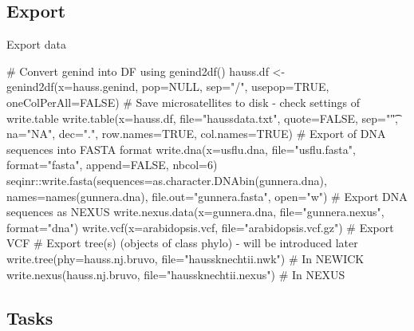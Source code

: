\documentclass[compress, xelatex, 11pt, xcolor=svgnames, aspectratio=169, url={hyphens, lowtilde}]{beamer}
\begin{document}
\subsection{Export}

\begin{frame}[fragile]{Export data}
	\begin{spluscode}
    # Convert genind into DF using genind2df()
    hauss.df <- genind2df(x=hauss.genind, pop=NULL, sep="/",
      usepop=TRUE, oneColPerAll=FALSE)
    # Save microsatellites to disk - check settings of write.table
    write.table(x=hauss.df, file="haussdata.txt", quote=FALSE,
      sep="\t", na="NA", dec=".", row.names=TRUE, col.names=TRUE)
    # Export of DNA sequences into FASTA format
    write.dna(x=usflu.dna, file="usflu.fasta", format="fasta",
      append=FALSE, nbcol=6)
    seqinr::write.fasta(sequences=as.character.DNAbin(gunnera.dna),
      names=names(gunnera.dna), file.out="gunnera.fasta", open="w")
    # Export DNA sequences as NEXUS
    write.nexus.data(x=gunnera.dna, file="gunnera.nexus", format="dna")
    write.vcf(x=arabidopsis.vcf, file="arabidopsis.vcf.gz") # Export VCF
    # Export tree(s) (objects of class phylo) - will be introduced later
    write.tree(phy=hauss.nj.bruvo, file="haussknechtii.nwk") # In NEWICK
    write.nexus(hauss.nj.bruvo, file="haussknechtii.nexus") # In NEXUS
	\end{spluscode}
\end{frame}

\subsection{Tasks}
\end{document}
